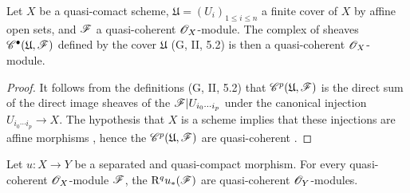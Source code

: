 \begin{lemma}[1.4.9]
\label{3.1.4.9}
Let $X$ be a quasi-comact scheme, $\mathfrak{U}=(U_i)_{1\leq i\leq n}$ a finite cover of $X$ by affine open sets, and $\mathscr{F}$ a quasi-coherent $\mathscr{O}_X$-module.
The complex of sheaves $\mathscr{C}^\bullet(\mathfrak{U},\mathscr{F})$ defined by the cover $\mathfrak{U}$ (G, II, 5.2) is then a quasi-coherent $\mathscr{O}_X$-module.
\end{lemma}

\begin{proof}
\label{proof-3.1.4.9}
It follows from the definitions (G, II, 5.2) that $\mathscr{C}^p(\mathfrak{U},\mathscr{F})$ is the direct sum of the direct image sheaves of the $\mathscr{F}|U_{i_0\cdots i_p}$ under the canonical injection $U_{i_0\cdots i_p}\to X$.
The hypothesis that $X$ is a scheme implies that these injections are affine morphisms , hence the $\mathscr{C}^p(\mathfrak{U},\mathscr{F})$ are quasi-coherent .
\end{proof}

\begin{proposition}[1.4.10]
\label{3.1.4.10}
Let $u:X\to Y$ be a separated and quasi-compact morphism.
For every quasi-coherent $\mathscr{O}_X$-module $\mathscr{F}$, the $\mathrm{R}^q u_*(\mathscr{F})$ are quasi-coherent $\mathscr{O}_Y$-modules.
\end{proposition}


